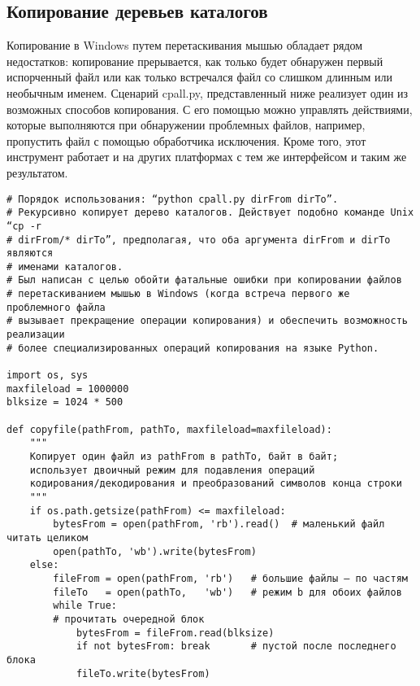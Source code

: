 \documentclass[12pt]{article}
\begin{document}
\subsection{Копирование деревьев каталогов}
Копирование в Windows путем перетаскивания
мышью обладает рядом недостатков: копирование прерывается,
как только будет обнаружен первый испорченный файл или как только встречался файл со слишком длинным или необычным именем. Сценарий cpall.py, представленный ниже
реализует один из возможных способов копирования. С его помощью
можно управлять действиями, которые выполняются при обнаружении проблемных файлов, например, пропустить файл с помощью обработчика исключения. Кроме того, этот инструмент работает и на других платформах с тем же интерфейсом и таким же результатом.
\begin{verbatim}
# Порядок использования: “python cpall.py dirFrom dirTo”.
# Рекурсивно копирует дерево каталогов. Действует подобно команде Unix “cp -r
# dirFrom/* dirTo”, предполагая, что оба аргумента dirFrom и dirTo являются
# именами каталогов.
# Был написан с целью обойти фатальные ошибки при копировании файлов
# перетаскиванием мышью в Windows (когда встреча первого же проблемного файла
# вызывает прекращение операции копирования) и обеспечить возможность реализации
# более специализированных операций копирования на языке Python.

import os, sys
maxfileload = 1000000
blksize = 1024 * 500

def copyfile(pathFrom, pathTo, maxfileload=maxfileload):
    """
    Копирует один файл из pathFrom в pathTo, байт в байт;
	использует двоичный режим для подавления операций
	кодирования/декодирования и преобразований символов конца строки
    """
    if os.path.getsize(pathFrom) <= maxfileload:
        bytesFrom = open(pathFrom, 'rb').read()  # маленький файл читать целиком
        open(pathTo, 'wb').write(bytesFrom)
    else:
        fileFrom = open(pathFrom, 'rb')   # большие файлы – по частям
        fileTo   = open(pathTo,   'wb')   # режим b для обоих файлов
        while True:
        # прочитать очередной блок
            bytesFrom = fileFrom.read(blksize)    
            if not bytesFrom: break       # пустой после последнего блока
            fileTo.write(bytesFrom)


\end{verbatim}
\end{document}
